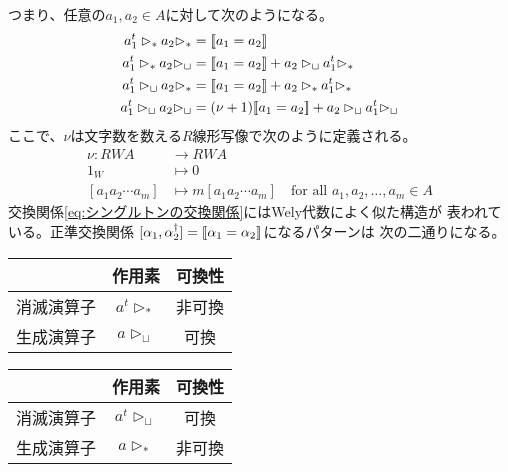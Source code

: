 		つまり、任意の$a_1,a_2\in A$に対して次のようになる。
		\begin{equation}\label{eq:シングルトンの交換関係}\begin{split} %
			a_1^t\rhd_*a_2\rhd_* &= \jump{a_1=a_2} \\
			a_1^t\rhd_*a_2\rhd_\sqcup &= \jump{a_1=a_2}+a_2\rhd_\sqcup a_1^t\rhd_* \\
			a_1^t\rhd_\sqcup a_2\rhd_* &= \jump{a_1=a_2}+a_2\rhd_* a_1^t\rhd_* \\
			a_1^t\rhd_\sqcup a_2\rhd_\sqcup	&= (\nu+1)\jump{a_1=a_2}+a_2\rhd_\sqcup a_1^t\rhd_\sqcup \\
		\end{split}\end{equation} %
		ここで、$\nu$は文字数を数える$R$線形写像で次のように定義される。
		\begin{equation*}\begin{split} %
			\nu: RWA &\to RWA \\
				1_W &\mapsto 0 \\
				[a_1a_2\cdots a_m] &\mapsto m[a_1a_2\cdots a_m]
				\quad\text{for all }a_1,a_2,\dots,a_m\in A
		\end{split}\end{equation*} %
		交換関係\eqref{eq:シングルトンの交換関係}にはWely代数によく似た構造が
		表われている。正準交換関係
		$[\alpha_1,\alpha_2^\dag]=[\![\alpha_1=\alpha_2]\!]$になるパターンは
		次の二通りになる。\\
		\begin{minipage}{0.5\hsize}
			\begin{center}\begin{tabular}{c|cc}
				& 作用素 & 可換性 \\ \hline
				消滅演算子 & $a^t\rhd_*$ & 非可換 \\
				生成演算子 & $a\rhd_\sqcup$ & 可換 \\
			\end{tabular}\end{center}
		\end{minipage}
		\begin{minipage}{0.5\hsize}
			\begin{center}\begin{tabular}{c|cc}
				& 作用素 & 可換性 \\ \hline
				消滅演算子 & $a^t\rhd_\sqcup$ & 可換 \\
				生成演算子 & $a\rhd_*$ & 非可換 \\
			\end{tabular}\end{center}
		\end{minipage}
